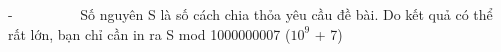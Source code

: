 -          Số nguyên S là số cách chia thỏa yêu cầu đề bài. Do kết quả có thể rất lớn, bạn chỉ cần in ra S mod 1000000007 ($10^{9}$   + 7)